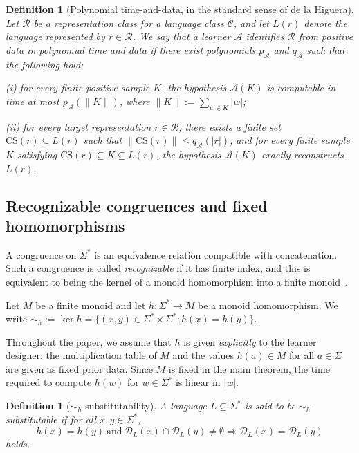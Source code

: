 \documentclass[11pt,a4paper]{article}
\newtheorem{definition}[theorem]{Definition}
\newcommand{\D}{\mathcal{D}}
\newcommand{\CS}{\mathrm{CS}}
\begin{document}
\begin{definition}[Polynomial time-and-data, in the standard sense of de la Higuera]
Let $\mathcal{R}$ be a representation class for a language class $\mathcal{C}$, and let $L(r)$ denote the language represented by $r \in \mathcal{R}$. We say that a learner $\mathcal{A}$ \emph{identifies $\mathcal{R}$ from positive data in polynomial time and data} if there exist polynomials $p_{\mathcal{A}}$ and $q_{\mathcal{A}}$ such that the following hold:

(i) for every finite positive sample $K$, the hypothesis $\mathcal{A}(K)$ is computable in time at most $p_{\mathcal{A}}(\|K\|)$, where $\|K\| := \sum_{w \in K} |w|$;

(ii) for every target representation $r \in \mathcal{R}$, there exists a finite set $\CS(r) \subseteq L(r)$ such that $\|\CS(r)\| \le q_{\mathcal{A}}(|r|)$, and for every finite sample $K$ satisfying $\CS(r) \subseteq K \subseteq L(r)$, the hypothesis $\mathcal{A}(K)$ exactly reconstructs $L(r)$.
\end{definition}

\subsection{Recognizable congruences and fixed homomorphisms}

A congruence on $\Sigma^*$ is an equivalence relation compatible with
concatenation. Such a congruence is called \emph{recognizable} if it has
finite index, and this is equivalent to being the kernel of a monoid
homomorphism into a finite monoid~\cite{eilenberg1974}.

Let $M$ be a finite monoid and let $h:\Sigma^*\to M$ be a monoid
homomorphism. We write
$\sim_h:=\ker h=\{(x,y)\in\Sigma^*\times\Sigma^*:h(x)=h(y)\}$.

Throughout the paper, we assume that $h$ is given \emph{explicitly} to
the learner designer: the multiplication table of $M$ and the values
$h(a)\in M$ for all $a\in\Sigma$ are given as fixed prior data. Since
$M$ is fixed in the main theorem, the time required to compute $h(w)$
for $w\in\Sigma^*$ is linear in $|w|$.

\begin{definition}[\texorpdfstring{$\sim_h$}{sim\_h}-substitutability]
A language $L\subseteq\Sigma^*$ is said to be
\emph{$\sim_h$-substitutable} if for all $x,y\in\Sigma^*$,
\[
h(x)=h(y)\ \text{and}\ \D_L(x)\cap\D_L(y)\neq\emptyset
\Longrightarrow \D_L(x)=\D_L(y)
\]
holds.
\end{definition}
\end{document}
